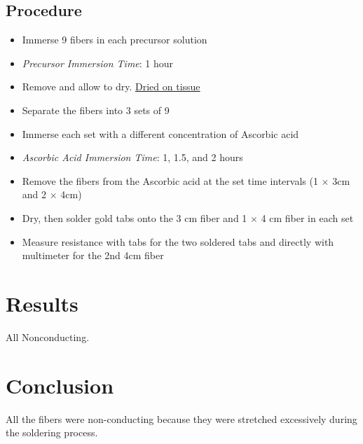 \documentclass{article}
\begin{document}
\subsection{Procedure}
\begin{itemize}
    \item Immerse 9 fibers in each precursor solution
    \item \textit{Precursor Immersion Time}: 1 hour
    \item Remove and allow to dry. \underline{Dried on tissue}
    \item Separate the fibers into 3 sets of 9
    \item Immerse each set with a different concentration of Ascorbic acid
    \item \textit{Ascorbic Acid Immersion Time}: 1, 1.5, and 2 hours
    \item Remove the fibers from the Ascorbic acid at the set time intervals (1 $\times$ 3cm and 2 $\times$ 4cm)
    \item Dry, then solder gold tabs onto the 3 cm fiber and 1 $\times$ 4 cm fiber in each set
    \item Measure resistance with tabs for the two soldered tabs and directly with multimeter for the 2nd 4cm fiber
\end{itemize}

\section{Results}
All Nonconducting.

\section{Conclusion}
All the fibers were non-conducting because they were stretched excessively during the soldering process.
\end{document}
